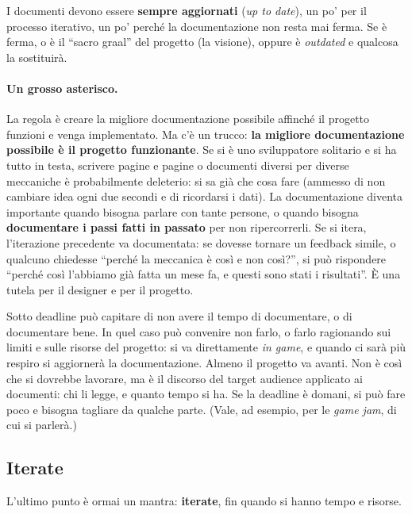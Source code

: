 I documenti devono essere \textbf{sempre aggiornati} (\emph{up to date}), un
po' per il processo iterativo, un po' perché la documentazione non resta mai
ferma. Se è ferma, o è il ``sacro graal'' del progetto (la visione), oppure è
\emph{outdated} e qualcosa la sostituirà.

\paragraph{Un grosso asterisco.} La regola è creare la migliore
documentazione possibile affinché il progetto funzioni e venga implementato.
Ma c'è un trucco: \textbf{la migliore documentazione possibile è il progetto
funzionante}. Se si è uno sviluppatore solitario e si ha tutto in testa,
scrivere pagine e pagine o documenti diversi per diverse meccaniche è
probabilmente deleterio: si sa già che cosa fare (ammesso di non cambiare idea
ogni due secondi e di ricordarsi i dati). La documentazione diventa
importante quando bisogna parlare con tante persone, o quando bisogna
\textbf{documentare i passi fatti in passato} per non ripercorrerli. Se si
itera, l'iterazione precedente va documentata: se dovesse tornare un feedback
simile, o qualcuno chiedesse ``perché la meccanica è così e non così?'', si
può rispondere ``perché così l'abbiamo già fatta un mese fa, e questi sono
stati i risultati''. È una tutela per il designer e per il progetto.

Sotto deadline può capitare di non avere il tempo di documentare, o di
documentare bene. In quel caso può convenire non farlo, o farlo ragionando sui
limiti e sulle risorse del progetto: si va direttamente \emph{in game}, e
quando ci sarà più respiro si aggiornerà la documentazione. Almeno il progetto
va avanti. Non è così che si dovrebbe lavorare, ma è il discorso del target
audience applicato ai documenti: chi li legge, e quanto tempo si ha. Se la
deadline è domani, si può fare poco e bisogna tagliare da qualche parte. (Vale,
ad esempio, per le \emph{game jam}, di cui si parlerà.)

\subsection{Iterate}

L'ultimo punto è ormai un mantra: \textbf{iterate}, fin quando si hanno tempo
e risorse.

